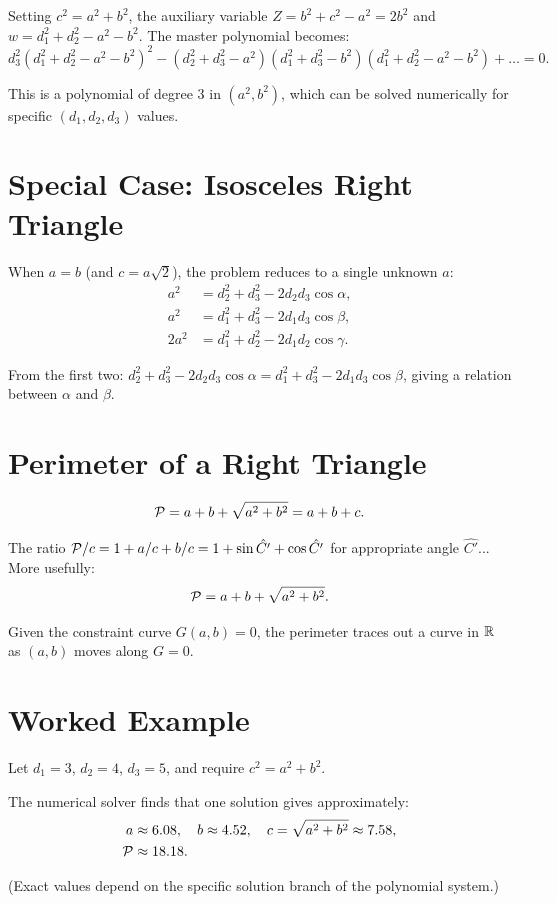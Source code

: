 Setting $c^2 = a^2 + b^2$, the auxiliary variable $Z = b^2 + c^2 - a^2 = 2b^2$ and $w = d_1^2 + d_2^2 - a^2 - b^2$. The master polynomial becomes:
\begin{equation}
d_3^2 (d_1^2 + d_2^2 - a^2 - b^2)^2 - (d_2^2 + d_3^2 - a^2)(d_1^2 + d_3^2 - b^2)(d_1^2 + d_2^2 - a^2 - b^2) + \ldots = 0.
\end{equation}

This is a polynomial of degree 3 in $(a^2, b^2)$, which can be solved numerically for specific $(d_1, d_2, d_3)$ values.

\section{Special Case: Isosceles Right Triangle}

When $a = b$ (and $c = a\sqrt{2}$), the problem reduces to a single unknown $a$:
\begin{align}
a^2 &= d_2^2 + d_3^2 - 2d_2 d_3 \cos\alpha, \\
a^2 &= d_1^2 + d_3^2 - 2d_1 d_3 \cos\beta, \\
2a^2 &= d_1^2 + d_2^2 - 2d_1 d_2 \cos\gamma.
\end{align}

From the first two: $d_2^2 + d_3^2 - 2d_2 d_3 \cos\alpha = d_1^2 + d_3^2 - 2d_1 d_3 \cos\beta$, giving a relation between $\alpha$ and $\beta$.

\section{Perimeter of a Right Triangle}

\begin{equation}
\mathcal{P} = a + b + \sqrt{a^2 + b^2} = a + b + c.
\end{equation}

The ratio $\mathcal{P} / c = 1 + a/c + b/c = 1 + \sin\hat{C'} + \cos\hat{C'}$ for appropriate angle $\hat{C'}$... More usefully:
\begin{equation}
\mathcal{P} = a + b + \sqrt{a^2 + b^2}.
\end{equation}

Given the constraint curve $G(a, b) = 0$, the perimeter traces out a curve in $\mathbb{R}$ as $(a, b)$ moves along $G = 0$.

\section{Worked Example}

\begin{example}
Let $d_1 = 3$, $d_2 = 4$, $d_3 = 5$, and require $c^2 = a^2 + b^2$.

The numerical solver finds that one solution gives approximately:
\begin{align}
a &\approx 6.08, \quad b \approx 4.52, \quad c = \sqrt{a^2 + b^2} \approx 7.58, \\
\mathcal{P} &\approx 18.18.
\end{align}

(Exact values depend on the specific solution branch of the polynomial system.)
\end{example}
